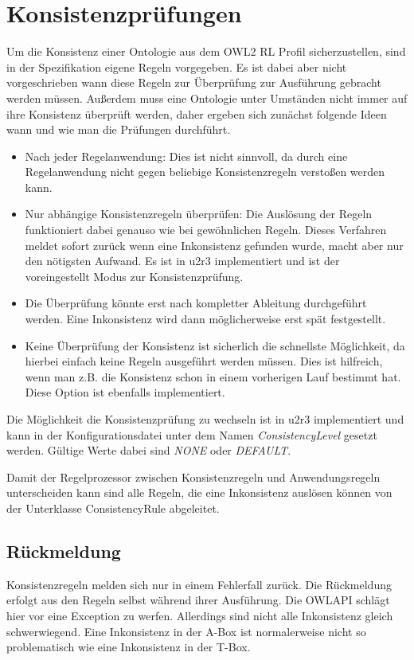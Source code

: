 \section{Konsistenzprüfungen}
Um die Konsistenz einer Ontologie aus dem OWL2 RL Profil sicherzustellen, sind in der Spezifikation eigene Regeln vorgegeben. Es ist dabei aber nicht vorgeschrieben wann diese Regeln zur Überprüfung zur Ausführung gebracht werden müssen. Außerdem muss eine Ontologie unter Umständen nicht immer auf ihre Konsistenz überprüft werden, daher ergeben sich zunächst folgende Ideen wann und wie man die Prüfungen durchführt.

\begin{itemize}
  \item Nach jeder Regelanwendung: Dies ist nicht sinnvoll, da durch eine Regelanwendung nicht gegen beliebige Konsistenzregeln verstoßen werden kann.
  \item Nur abhängige Konsistenzregeln überprüfen: Die Auslösung der Regeln funktioniert dabei genauso wie bei gewöhnlichen Regeln. Dieses Verfahren meldet sofort zurück wenn eine Inkonsistenz gefunden wurde, macht aber nur den nötigsten Aufwand. Es ist in u2r3 implementiert und ist der voreingestellt Modus zur Konsistenzprüfung.
  \item Die Überprüfung könnte erst nach kompletter Ableitung durchgeführt werden. Eine Inkonsistenz wird dann möglicherweise erst spät festgestellt.
  \item Keine Überprüfung der Konsistenz ist sicherlich die schnellste Möglichkeit, da hierbei einfach keine Regeln ausgeführt werden müssen. Dies ist hilfreich, wenn man z.B. die Konsistenz schon in einem vorherigen Lauf bestimmt hat. Diese Option ist ebenfalls implementiert.
\end{itemize} 
Die Möglichkeit die Konsistenzprüfung zu wechseln ist in u2r3 implementiert und kann in der Konfigurationsdatei unter dem Namen \emph{ConsistencyLevel} gesetzt werden. Gültige Werte dabei sind \emph{NONE} oder \emph{DEFAULT}.

Damit der Regelprozessor zwischen Konsistenzregeln und Anwendungsregeln unterscheiden kann sind alle Regeln, die eine Inkonsistenz auslösen können von der Unterklasse ConsistencyRule abgeleitet.

\subsection{Rückmeldung}
Konsistenzregeln melden sich nur in einem Fehlerfall zurück. Die Rückmeldung erfolgt aus den Regeln selbst während ihrer Ausführung. Die OWLAPI schlägt hier vor eine Exception zu werfen. Allerdings sind nicht alle Inkonsistenz gleich schwerwiegend. Eine Inkonsistenz in der A-Box ist normalerweise nicht so problematisch wie eine Inkonsistenz in der T-Box.

